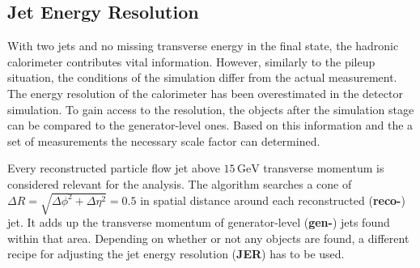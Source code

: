 \subsection{Jet Energy Resolution}
\label{sec:jer}

With two jets and no missing transverse energy in the final state, the hadronic calorimeter contributes vital information. However, similarly to the pileup situation, the conditions of the simulation differ from the actual measurement. The energy resolution of the calorimeter has been overestimated in the detector simulation. To gain access to the resolution, the objects after the simulation stage can be compared to the generator-level ones. Based on this information and the a set of measurements the necessary scale factor can determined.

Every reconstructed particle flow jet above $15\,\text{GeV}$ transverse momentum is considered relevant for the analysis. The algorithm searches a cone of $\Delta R = \sqrt{\Delta\phi^2 + \Delta\eta^2} = 0.5$ in spatial distance around each reconstructed (\textbf{reco-}) jet. It adds up the transverse momentum of generator-level (\textbf{gen-}) jets found within that area. Depending on whether or not any objects are found, a different recipe for adjusting the jet energy resolution (\textbf{JER}) has to be used.

